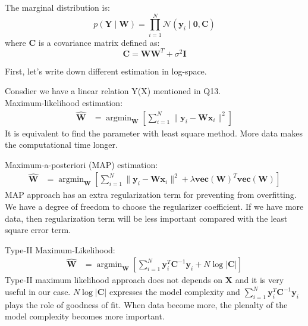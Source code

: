 \documentclass[12pt]{article}
\newenvironment{question}[2][Question]{\begin{trivlist}
\kern10pt
\item[\hskip \labelsep {\bfseries #1}\hskip \labelsep {\bfseries #2.}]}{\end{trivlist}}
\begin{document}
\begin{question}{13}
The marginal distribution is:
\begin{equation}\label{eq:q13-result}
  p(\mathbf{Y}\mid\mathbf{W}) 
  = \prod_{i=1}^{N} 
    \mathcal{N}(\mathbf{y}_i\mid\mathbf{0}, \mathbf{C})
\end{equation}
where $\mathbf{C}$ is a covariance matrix defined as:
\begin{equation}\label{eq:q13-matC}
  \mathbf{C} = \mathbf{W}\mathbf{W}^T + \sigma^2\mathbf{I}
\end{equation}
\end{question}

\begin{question}{14}
First, let's write down different estimation in log-space.

Consdier we have a linear relation Y(X) mentioned in Q13.
\\ 
Maximum-likelihood estimation:
\begin{align*}
  \hat{\mathbf{W}} 
  &= \operatorname{argmin}_{\mathbf{W}}
    [\sum_{i=1}^{N} \| \mathbf{y}_i - \mathbf{W}\mathbf{x}_i\|^2]
\end{align*}
It is equivalent to find the parameter with least square method. More data makes
the computational time longer.

Maximum-a-posteriori (MAP) estimation:
\begin{align*}
  \hat{\mathbf{W}} 
  &= \operatorname{argmin}_{\mathbf{W}}
    [\sum_{i=1}^{N} \| \mathbf{y}_i - \mathbf{W}\mathbf{x}_i\|^2
      + \lambda \textbf{vec}(\textbf{W})^T\textbf{vec}(\textbf{W})]
\end{align*}
MAP approach has an extra regularization term for preventing from overfitting.
We have a degree of freedom to choose the regularizer coefficient.
If we have more data, then regularization term will be less important compared
with the least square error term.

Type-II Maximum-Likelihood:
\begin{align*}
  \hat{\mathbf{W}} 
  &= \operatorname{argmin}_{\mathbf{W}}
    [\sum_{i=1}^{N} \mathbf{y}_i^T \mathbf{C}^{-1}\mathbf{y}_i
      + N\log{|\mathbf{C}|}]
\end{align*}
Type-II maximum likelihood approach does not depends on $\mathbf{X}$ and it is
very useful in our case. $N\log{|\mathbf{C}|}$ expresses the model complexity
and $\sum_{i=1}^{N} \mathbf{y}_i^T \mathbf{C}^{-1}\mathbf{y}_i$ plays the role of
goodness of fit. When data become more, the plenalty of the model complexity becomes
more important.
  

\end{question}
\end{document}
